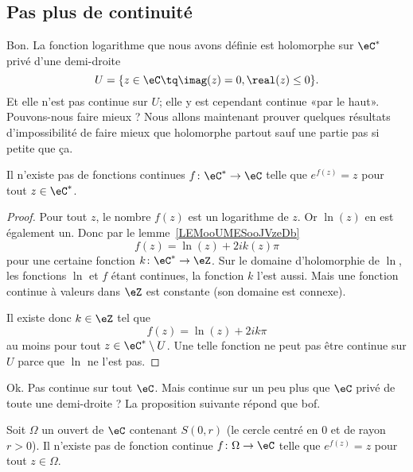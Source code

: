 \subsection{Pas plus de continuité}

Bon. La fonction logarithme que nous avons définie est holomorphe sur \( \eC^*\) privé d'une demi-droite
\begin{equation}		\label{EQooDOELooBQpPyG}
	U=\{ z\in \eC\tq \imag(z)=0,\real(z)\leq 0 \}.
\end{equation}
Et elle n'est pas continue sur \( U\); elle y est cependant continue «par le haut». Pouvons-nous faire mieux ? Nous allons maintenant prouver quelques résultats d'impossibilité de faire mieux que holomorphe partout sauf une partie pas si petite que ça.

\begin{proposition}
	Il n'existe pas de fonctions continues \( f\colon \eC^*\to \eC\) telle que \(  e^{f(z)}=z\) pour tout \( z\in \eC^*\).
\end{proposition}

\begin{proof}
	Pour tout \( z\), le nombre \( f(z)\) est un logarithme de \( z\). Or \( \ln(z)\) en est également un. Donc par le lemme~\ref{LEMooUMESooJVzeDb}
	\begin{equation}
		f(z)=\ln(z)+2i k(z)\pi
	\end{equation}
	pour une certaine fonction \( k\colon \eC^*\to \eZ\). Sur le domaine d'holomorphie de \( \ln\), les fonctions \( \ln\) et \( f\) étant continues, la fonction \( k\) l'est aussi. Mais une fonction continue à valeurs dans \( \eZ\) est constante (son domaine est connexe).

	Il existe donc \( k\in \eZ\) tel que
	\begin{equation}
		f(z)=\ln(z)+2ik\pi
	\end{equation}
	au moins pour tout \( z\in \eC^*\setminus U\). Une telle fonction ne peut pas être continue sur \( U\) parce que \( \ln\) ne l'est pas.
\end{proof}

Ok. Pas continue sur tout \( \eC\). Mais continue sur un peu plus que \( \eC\) privé de toute une demi-droite ? La proposition suivante répond que bof.

\begin{proposition}
	Soit \( \Omega\) un ouvert de \( \eC\) contenant \( S(0,r)\) (le cercle centré en \( 0\) et de rayon \( r>0\)). Il n'existe pas de fonction continue \( f\colon \Omega\to \eC\) telle que \(  e^{f(z)}=z\) pour tout \( z\in \Omega\).
\end{proposition}

